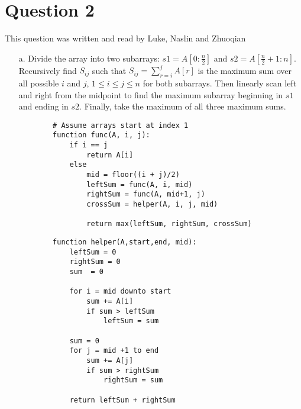 \documentclass[12pt]{article}
\begin{document}
\section*{Question 2}
This question was written and read by Luke, Naslin and Zhuoqian
\begin{enumerate}
    \item[a.] Divide the array into two subarrays: $s1 = A[0:\frac{n}{2}]$ and $s2 = A[\frac{n}{2} + 1:n]$. Recursively find $S_{ij}$ such that $S_{ij} = \sum_{r=i}^j A[r]$ is the maximum sum over all possible $i$ and $j$, $1 \leq i \leq j \leq n$ for both subarrays. Then linearly scan left and right from the midpoint to find the maximum subarray beginning in $s1$ and ending in $s2$. Finally, take the maximum of all three maximum sums. 
    \begin{verbatim}
        # Assume arrays start at index 1
        function func(A, i, j):
            if i == j
                return A[i]
            else 
                mid = floor((i + j)/2)
                leftSum = func(A, i, mid)
                rightSum = func(A, mid+1, j)
                crossSum = helper(A, i, j, mid)
        
                return max(leftSum, rightSum, crossSum)
    \end{verbatim}
    
    \begin{verbatim}
        function helper(A,start,end, mid):
            leftSum = 0
            rightSum = 0
            sum  = 0
        
            for i = mid downto start
                sum += A[i]
                if sum > leftSum
                    leftSum = sum
            
            sum = 0
            for j = mid +1 to end
                sum += A[j]
                if sum > rightSum
                    rightSum = sum
            
            return leftSum + rightSum
    \end{verbatim}
    

\end{enumerate}
\end{document}
